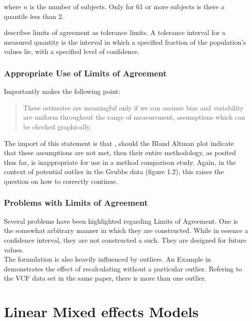 \documentclass[12pt, a4paper]{report}
\theoremstyle{plain}
\theoremstyle{definition}
\theoremstyle{remark}
\begin{document}
	\noindent where $n$ is the number of subjects. Only for 61 or more
	subjects is there a quantile less than 2.
	
	\citet{luiz} describes limits of agreement as tolerance limits. A
	tolerance interval for a measured quantity is the interval in
	which a specified fraction of the population's values lie, with a
	specified level of confidence.
	
	
	\subsection{Appropriate Use of Limits of Agreement}
	Importantly \citet{BA99} makes the following point:
	\begin{quote}These estimates are meaningful only if we can assume
		bias and variability are uniform throughout the range of
		measurement, assumptions which can be checked graphically.
	\end{quote}
	
	The import of this statement is that , should the Bland Altman
	plot indicate that these assumptions are not met, then their
	entire methodology, as posited thus far, is inappropriate for use
	in a method comparison study. Again, in the context of potential
	outlier in the Grubbs data (figure 1.2), this raises the question
	on how to correctly continue.
	\subsection{Problems with Limits of Agreement}
	
	Several problems have been highlighted regarding Limits of
	Agreement. One is the somewhat arbitrary manner in which they are
	constructed. While in essence a confidence interval, they are not
	constructed a such. They are designed for future values.
	\\
	The formulation is also heavily influenced by outliers. An Example
	in \citet*{BA83} demonstrates the effect of recalculating without
	a particular outlier. Refering to the VCF data set in the same
	paper, there is more than one outlier.
	
	
	\chapter{Linear Mixed effects Models}
\end{document}
